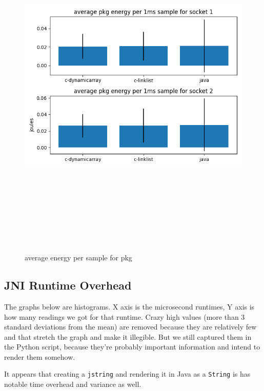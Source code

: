     \begin{figure}[H]
    	\centering
    	\includegraphics[width=17cm,height=17cm,keepaspectratio]{AsyncMonitorCompares/time-energy-persample/pkg_average_joules_per-sample.png}
    	\caption{average energy per sample for pkg}
   	\label{fig:xalan-PKG-Time-scatter}
    \end{figure}
    
\subsection{JNI Runtime Overhead}
    The graphs below are histograms. X axis is the microsecond runtimes, Y axis is how many readings we got
    for that runtime. Crazy high values (more than 3 standard deviations from the mean) are removed because they are relatively few and that stretch the graph and make it illegible. But we still captured
    them in the Python script, because they're probably important information and intend to render them somehow.

    It appears that creating a \texttt{jstring} and rendering it in Java as a \texttt{String} is has notable time overhead and variance as well.
    
